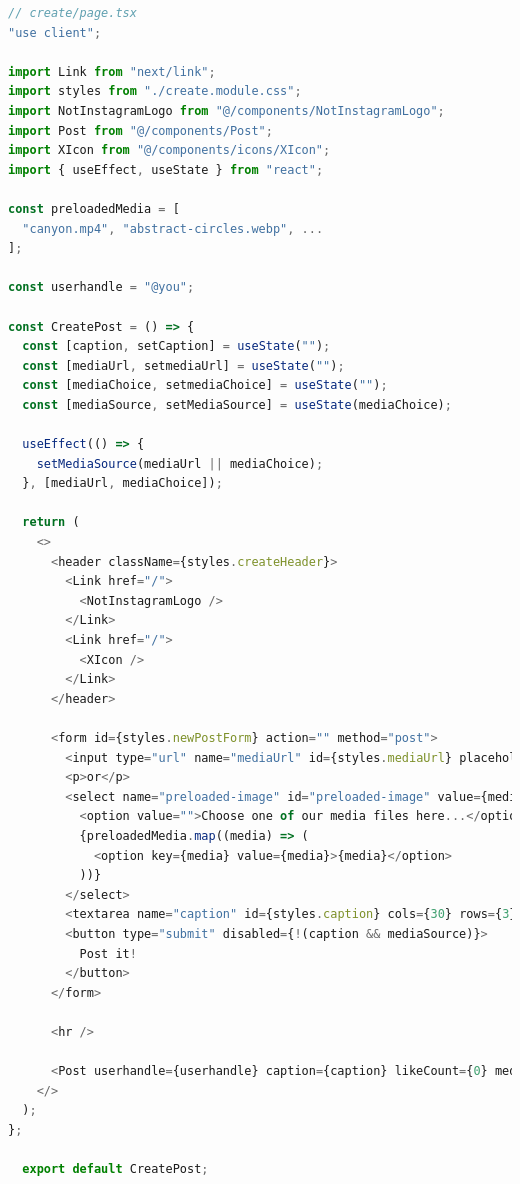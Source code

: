 \documentclass[a4paper, 10pt]{article}
\begin{document}
\begin{lstlisting}[caption=Create page in Next.js, label={lst:Next:Create}, language=JavaScript]
// create/page.tsx
"use client";

import Link from "next/link";
import styles from "./create.module.css";
import NotInstagramLogo from "@/components/NotInstagramLogo";
import Post from "@/components/Post";
import XIcon from "@/components/icons/XIcon";
import { useEffect, useState } from "react";
  
const preloadedMedia = [
  "canyon.mp4", "abstract-circles.webp", ...
];
  
const userhandle = "@you";

const CreatePost = () => {
  const [caption, setCaption] = useState("");
  const [mediaUrl, setmediaUrl] = useState("");
  const [mediaChoice, setmediaChoice] = useState("");
  const [mediaSource, setMediaSource] = useState(mediaChoice);

  useEffect(() => {
    setMediaSource(mediaUrl || mediaChoice);
  }, [mediaUrl, mediaChoice]);
    
  return (
    <>
      <header className={styles.createHeader}>
        <Link href="/">
          <NotInstagramLogo />
        </Link>
        <Link href="/">
          <XIcon />
        </Link>
      </header>
    
      <form id={styles.newPostForm} action="" method="post">
        <input type="url" name="mediaUrl" id={styles.mediaUrl} placeholder="Insert your media URL here..." value={mediaUrl} onChange={(event) => setmediaUrl(event.target.value)} />
        <p>or</p>
        <select name="preloaded-image" id="preloaded-image" value={mediaChoice} onChange={(event) => setmediaChoice(event.target.value)} >
          <option value="">Choose one of our media files here...</option>
          {preloadedMedia.map((media) => (
            <option key={media} value={media}>{media}</option>
          ))}
        </select>
        <textarea name="caption" id={styles.caption} cols={30} rows={3} placeholder="Type your caption here" value={caption} onChange={(event) => setCaption(event.target.value)} />
        <button type="submit" disabled={!(caption && mediaSource)}>
          Post it!
        </button>
      </form>
    
      <hr />
    
      <Post userhandle={userhandle} caption={caption} likeCount={0} mediaSource={mediaSource} hideActionIcons={true} />
    </>
  );
};
  
  export default CreatePost;
  
\end{lstlisting}
\end{document}

